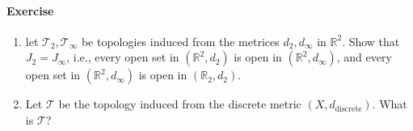 \paragraph{Exercise}
\begin{enumerate}
\item
let $\mathcal{T}_2,\mathcal{T}_\infty$ be topologies induced from the metrices $d_2,d_\infty$ in $\mathbb{R}^2$. Show that $J_2=J_\infty$, i.e., every open set in $(\mathbb{R}^2,d_2)$ is open in $(\mathbb{R}^2,d_\infty)$, and every open set in $(\mathbb{R}^2,d_\infty)$ is open in $(\mathbb{R}_2,d_2)$.






\item
Let $\mathcal{T}$ be the topology induced from the discrete metric $(X,d_{\text{discrete}}).$ What is $\mathcal{T}$?

\end{enumerate}












